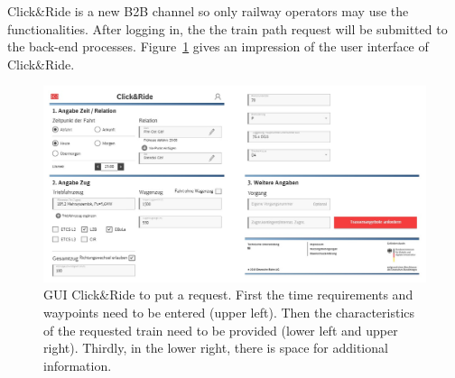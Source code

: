 Click\&Ride is a new B2B channel so only railway operators may use the functionalities. After logging in, the the train path request will be submitted to the back-end processes. Figure~\ref{fig:CnR_request} gives an impression of the user interface of Click\&Ride.
\begin{figure}[htb]
	\centering
	\includegraphics[width=\textwidth]{Bilder/request.jpg}
	\caption{GUI Click\&Ride to put a request. First the time requirements and waypoints need to be entered (upper left). Then the characteristics of the requested train need to be provided (lower left and upper right). Thirdly, in the lower right, there is space for additional information.}
	\label{fig:CnR_request}
\end{figure}

